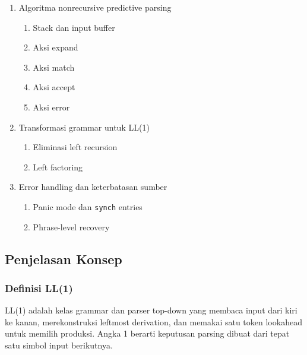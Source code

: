 \begin{enumerate}
    \begin{enumerate}
        \item \pwajib Tidak ada multiply defined entries
        \item \pwajib Konflik akibat ambiguitas
        \item \pwajib Konflik akibat left recursion
        \item \pwajib Konflik akibat belum left-factored
    \end{enumerate}
    \item \pwajib Algoritma nonrecursive predictive parsing
    \begin{enumerate}
        \item \pwajib Stack dan input buffer
        \item \pwajib Aksi expand
        \item \pwajib Aksi match
        \item \pwajib Aksi accept
        \item \pwajib Aksi error
    \end{enumerate}
    \item \ppaham Transformasi grammar untuk LL(1)
    \begin{enumerate}
        \item \ppaham Eliminasi left recursion
        \item \ppaham Left factoring
    \end{enumerate}
    \item \ppaham Error handling dan keterbatasan sumber
    \begin{enumerate}
        \item \ppaham Panic mode dan \texttt{synch} entries
        \item \ppaham Phrase-level recovery
    \end{enumerate}
\end{enumerate}

\subsection{Penjelasan Konsep}

\subsubsection{Definisi LL(1)}

\begin{jawab}
LL(1) adalah kelas grammar dan parser top-down yang membaca input dari kiri ke kanan, merekonstruksi leftmost derivation, dan memakai satu token lookahead untuk memilih produksi. Angka 1 berarti keputusan parsing dibuat dari tepat satu simbol input berikutnya.
\end{jawab}

